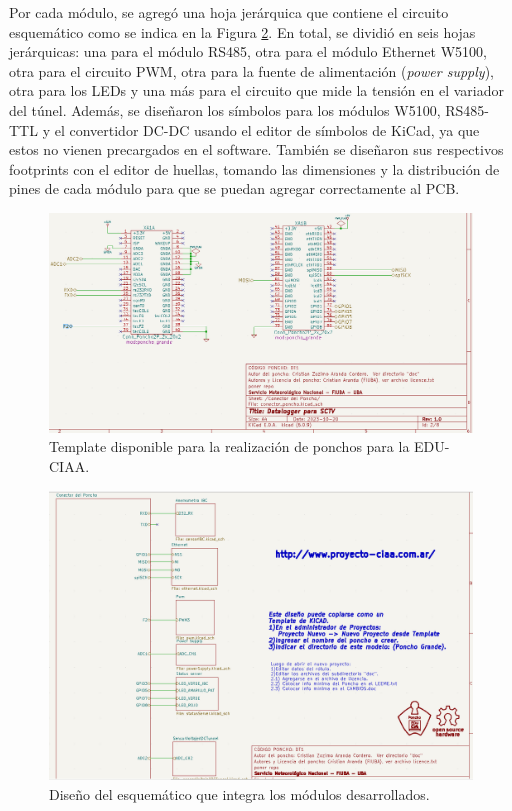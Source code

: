 Por cada módulo, se agregó una hoja jerárquica que contiene el circuito esquemático como se indica en la Figura \ref{fig:esquematicoPonchoDatalogger}. En total, se dividió en seis hojas jerárquicas: una para el módulo RS485, otra para el módulo Ethernet W5100, otra para el circuito PWM, otra para la fuente de alimentación (\textit{power supply}), otra para los LEDs y una más para el circuito que mide la tensión en el variador del túnel. Además, se diseñaron los símbolos para los módulos W5100, RS485-TTL y el convertidor DC-DC usando el editor de símbolos de KiCad, ya que estos no vienen precargados en el software. También se diseñaron sus respectivos footprints con el editor de huellas, tomando las dimensiones y la distribución de pines de cada módulo para que se puedan agregar correctamente al PCB.

\begin{figure}[H]
    \centering
    \includegraphics[width=0.95\linewidth]{Figuras/datalogger/Hardware/HojaTemplatePonchoCiaa.png}
    \caption{Template disponible para la realización de ponchos para la EDU-CIAA.}
    \label{fig:HojaTemplatePonchoCiaa}
\end{figure}


\begin{figure}[H]
    \centering
    \includegraphics[width=0.8\linewidth]{Figuras/datalogger/Hardware/esquematicoPonchoDatalogger.png}
    \caption{Diseño del esquemático que integra los módulos desarrollados.}
    \label{fig:esquematicoPonchoDatalogger}
\end{figure}



